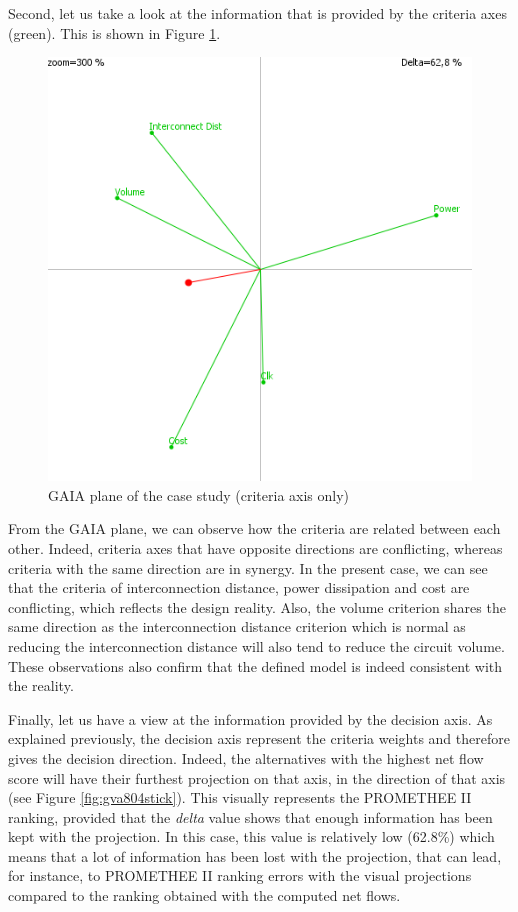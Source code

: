 Second, let us take a look at the information that is provided by the criteria axes (green). This is shown in Figure \ref{fig:gva804crit}.

\begin{figure}[h!]
\begin{center}
\includegraphics[width=0.8\linewidth]{gva804crit}
\end{center}
\caption{GAIA plane of the case study (criteria axis only)}
\label{fig:gva804crit}
\end{figure}

From the GAIA plane, we can observe how the criteria are related between each other. Indeed, criteria axes that have opposite directions are conflicting, whereas criteria with the same direction are in synergy. In the present case, we can see that the criteria of interconnection distance, power dissipation and cost are conflicting, which reflects the design reality. Also, the volume criterion shares the same direction as the interconnection distance criterion which is normal as reducing the interconnection distance will also tend to reduce the circuit volume. These observations also confirm that the defined model is indeed consistent with the reality.

Finally, let us have a view at the information provided by the decision axis. As explained previously, the decision axis represent the criteria weights and therefore gives the decision direction. Indeed, the alternatives with the highest net flow score will have their furthest projection on that axis, in the direction of that axis (see Figure \ref{fig:gva804stick}). This visually represents the PROMETHEE II ranking, provided that the \textit{delta} value shows that enough information has been kept with the projection. In this case, this value is relatively low (62.8\%) which means that a lot of information has been lost with the projection, that can lead, for instance, to PROMETHEE II ranking errors with the visual projections compared to the ranking obtained with the computed net flows.

